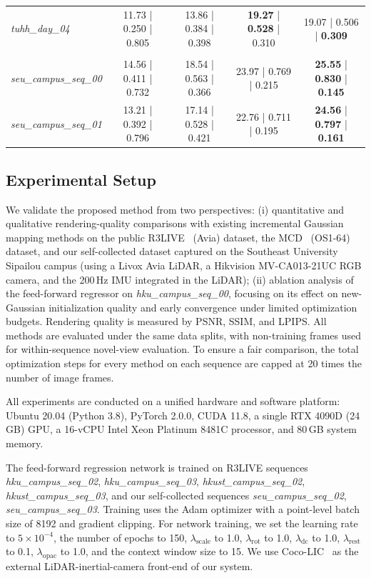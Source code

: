 \documentclass[letterpaper,journal]{IEEEtran}
\newcommand{\datasetname}[1]{\mbox{\normalfont\itshape #1}}
\begin{document}
\begin{table}[!t]
{\begin{tabular}{lcccc}
\datasetname{tuhh\_day\_04} & 11.73 | 0.250 | 0.805 & 13.86 | 0.384 | 0.398 & \textbf{19.27} | \textbf{0.528} | 0.310 & 19.07 | 0.506 | \textbf{0.309} \\
\rowcolor{black!8}
\multicolumn{5}{l}{\textbf{Self-Collected Dataset (Avia)}} \\
\datasetname{seu\_campus\_seq\_00} & 14.56 | 0.411 | 0.732 & 18.54 | 0.563 | 0.366 & 23.97 | 0.769 | 0.215 & \textbf{25.55} | \textbf{0.830} | \textbf{0.145} \\
\datasetname{seu\_campus\_seq\_01} & 13.21 | 0.392 | 0.796 & 17.14 | 0.528 | 0.421 & 22.76 | 0.711 | 0.195 & \textbf{24.56} | \textbf{0.797} | \textbf{0.161} \\
\bottomrule
\end{tabular}%
}
\end{table}

\subsection{Experimental Setup}

We validate the proposed method from two perspectives: (i) quantitative and qualitative rendering-quality comparisons with existing incremental Gaussian mapping methods on the public R3LIVE~\cite{lin2022r} (Avia) dataset, the MCD~\cite{nguyen2024mcd} (OS1-64) dataset, and our self-collected dataset captured on the Southeast University Sipailou campus (using a Livox Avia LiDAR, a Hikvision MV-CA013-21UC RGB camera, and the 200\,Hz IMU integrated in the LiDAR); (ii) ablation analysis of the feed-forward regressor on \datasetname{hku\_campus\_seq\_00}, focusing on its effect on new-Gaussian initialization quality and early convergence under limited optimization budgets. Rendering quality is measured by PSNR, SSIM, and LPIPS. All methods are evaluated under the same data splits, with non-training frames used for within-sequence novel-view evaluation. To ensure a fair comparison, the total optimization steps for every method on each sequence are capped at 20 times the number of image frames.

All experiments are conducted on a unified hardware and software platform: Ubuntu 20.04 (Python 3.8), PyTorch 2.0.0, CUDA 11.8, a single RTX 4090D (24\,GB) GPU, a 16-vCPU Intel Xeon Platinum 8481C processor, and 80\,GB system memory.

The feed-forward regression network is trained on R3LIVE sequences \datasetname{hku\_campus\_seq\_02}, \datasetname{hku\_campus\_seq\_03}, \datasetname{hkust\_campus\_seq\_02}, \datasetname{hkust\_campus\_seq\_03}, and our self-collected sequences \datasetname{seu\_campus\_seq\_02}, \datasetname{seu\_campus\_seq\_03}. Training uses the Adam optimizer with a point-level batch size of 8192 and gradient clipping. For network training, we set the learning rate to $5\times10^{-4}$, the number of epochs to 150, $\lambda_{\text{scale}}$ to 1.0, $\lambda_{\text{rot}}$ to 1.0, $\lambda_{\text{dc}}$ to 1.0, $\lambda_{\text{rest}}$ to 0.1, $\lambda_{\text{opac}}$ to 1.0, and the context window size to 15. We use Coco-LIC~\cite{lang2023coco} as the external LiDAR-inertial-camera front-end of our system.
\end{document}
